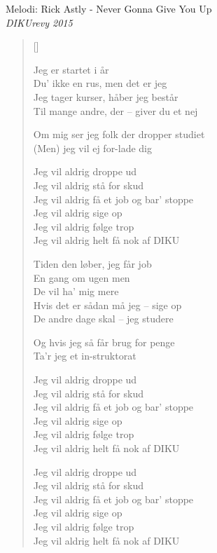 {Melodi: Rick Astly - Never Gonna Give You Up}\\[.2em]
{\small\itshape DIKUrevy 2015}
\begin{multicols}{2}
\settowidth{\versewidth}{Om mig ser jeg folk der dropper studiet}
\begin{verse}[\versewidth]

	    Jeg er startet i år\\
            Du' ikke en rus, men det er jeg\\
            Jeg tager kurser, håber jeg består\\
            Til mange andre, der -- giver du et nej

            Om mig ser jeg folk der dropper studiet\\
            (Men) jeg vil ej for-lade dig

            Jeg vil aldrig droppe ud\\
            Jeg vil aldrig stå for skud\\
            Jeg vil aldrig få et job og bar' stoppe\\
            Jeg vil aldrig sige op\\
            Jeg vil aldrig følge trop\\
            Jeg vil aldrig helt få nok af DIKU

            Tiden den løber, jeg får job\\
            En gang om ugen men\\
            De vil ha' mig mere\\
            Hvis det er sådan må jeg -- sige op\\
            De andre dage skal -- jeg studere

            Og hvis jeg så får brug for penge\\
            Ta'r jeg et in-struktorat

            Jeg vil aldrig droppe ud\\
            Jeg vil aldrig stå for skud\\
            Jeg vil aldrig få et job og bar' stoppe\\
            Jeg vil aldrig sige op\\
            Jeg vil aldrig følge trop\\
            Jeg vil aldrig helt få nok af DIKU

            Jeg vil aldrig droppe ud\\
            Jeg vil aldrig stå for skud\\
            Jeg vil aldrig få et job og bar' stoppe\\
            Jeg vil aldrig sige op\\
            Jeg vil aldrig følge trop\\
            Jeg vil aldrig helt få nok af DIKU


\end{verse}
\end{multicols}
